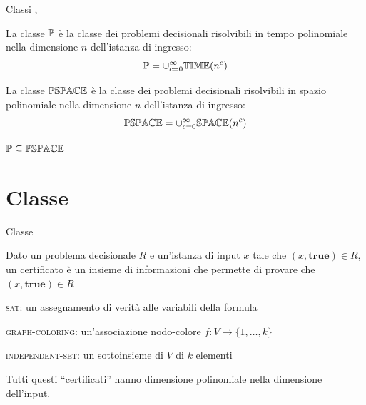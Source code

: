 \begin{frame}{Classi \PTIME, \PSPACE}

\vspace{-9pt}
\begin{myboxtitle}
La \alert{classe $\mbox{\sc $\mathbb{P}$}$} è la classe dei problemi decisionali risolvibili
in tempo polinomiale nella dimensione $n$ dell'istanza di ingresso:
\[
  \mbox{\sc $\mathbb{P}$} = \cup_{c=0}^{\infty} \mbox{$\mathbb{TIME}$}(n^c)
\]
\end{myboxtitle}

\begin{myboxtitle}
La \alert{classe $\mbox{$\mathbb{PSPACE}$}$} è la classe dei problemi decisionali risolvibili
in spazio polinomiale nella dimensione $n$ dell'istanza di ingresso:
\[
  \mbox{$\mathbb{PSPACE}$} = \cup_{c=0}^{\infty} \mbox{$\mathbb{SPACE}$}(n^c)
\]
\end{myboxtitle}

\begin{myboxtitle}[Note]
$\mbox{\sc $\mathbb{P}$} \subseteq \mbox{$\mathbb{PSPACE}$}$
\end{myboxtitle}

\end{frame}

\section{Classe \NP}
\begin{frame}{Classe \NP}

\vspace{-9pt}
\begin{myboxtitle}[Certificato]
Dato un problema decisionale $R$ e un'istanza di input $x$ tale
che $(x, \mathbf{true}) \in R$, un \alert{certificato} è un insieme di informazioni che permette di provare che $(x, \mathbf{true}) \in R$
\end{myboxtitle}

\begin{myboxtitle}[Esempi]
\BIL
\item \textsc{sat}: un assegnamento di verità alle variabili 
  della formula
\item \textsc{graph-coloring}: un'associazione nodo-colore $f: V \rightarrow \{ 1, \ldots, k \}$  
\item \textsc{independent-set}: un sottoinsieme di $V$ di $k$ elementi
\EIL

\medskip
Tutti questi ``certificati'' hanno dimensione polinomiale nella dimensione dell'input.
\end{myboxtitle}

\end{frame}


